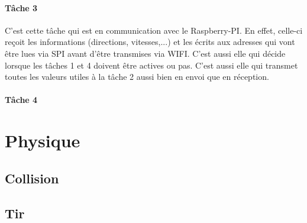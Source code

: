\paragraph{Tâche 3}

C'est cette tâche qui est en communication avec le Raspberry-PI. En effet, celle-ci reçoit les informations (directions, vitesses,...) et les écrits aux adresses qui vont être lues via SPI avant d'être transmises via WIFI. C'est aussi elle qui décide lorsque les tâches 1 et 4 doivent être actives ou pas. C'est aussi elle qui transmet toutes les valeurs  utiles à la tâche 2 aussi bien en envoi que en réception. 

\paragraph{Tâche 4}














\section{Physique}
	\subsection{Collision}
	\subsection{Tir}


